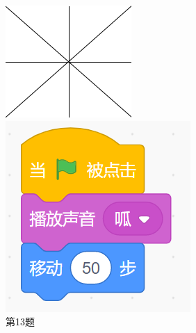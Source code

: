 \documentclass[10pt, a4paper]{article}
\begin{document}
\begin{enumerate}
        \begin{figure}[htbp]
            \centering
            \begin{minipage}[t]{.16\textwidth}
                \centering
                \includegraphics[width=\textwidth]{13.png}
                \caption*{第13题}
            \end{minipage}
            \begin{minipage}[t]{.38\textwidth}
                \centering
                \begin{minipage}[t]{.4\textwidth}
                    \centering
                    \includegraphics[width=\textwidth]{14-1.png}

\end{minipage}
\end{minipage}
\end{figure}
\end{enumerate}
\end{document}
